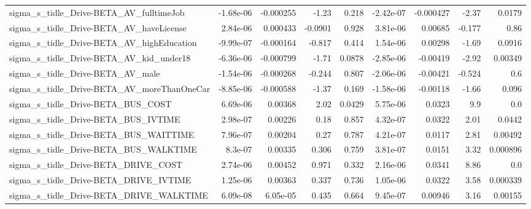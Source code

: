\begin{tabular}{lrrrrrrrr}
sigma\_s\_tidle\_Drive-BETA\_AV\_fulltimeJob            &   -1.68e-06 &    -0.000255 &    -1.23 &    0.218 &  -2.42e-07 &   -0.000427 &        -2.37 &        0.0179 \\
sigma\_s\_tidle\_Drive-BETA\_AV\_haveLicense            &    2.84e-06 &     0.000433 &  -0.0901 &    0.928 &   3.81e-06 &     0.00685 &       -0.177 &          0.86 \\
sigma\_s\_tidle\_Drive-BETA\_AV\_highEducation          &   -9.99e-07 &    -0.000164 &   -0.817 &    0.414 &   1.54e-06 &     0.00298 &        -1.69 &        0.0916 \\
sigma\_s\_tidle\_Drive-BETA\_AV\_kid\_under18            &   -6.36e-06 &    -0.000799 &    -1.71 &   0.0878 &  -2.85e-06 &    -0.00419 &        -2.92 &       0.00349 \\
sigma\_s\_tidle\_Drive-BETA\_AV\_male                   &   -1.54e-06 &    -0.000268 &   -0.244 &    0.807 &  -2.06e-06 &    -0.00421 &       -0.524 &           0.6 \\
sigma\_s\_tidle\_Drive-BETA\_AV\_moreThanOneCar         &   -8.85e-06 &    -0.000588 &    -1.37 &    0.169 &  -1.58e-06 &    -0.00118 &        -1.66 &         0.096 \\
sigma\_s\_tidle\_Drive-BETA\_BUS\_COST                  &    6.69e-06 &      0.00368 &     2.02 &   0.0429 &   5.75e-06 &      0.0323 &          9.9 &           0.0 \\
sigma\_s\_tidle\_Drive-BETA\_BUS\_IVTIME                &    2.98e-07 &      0.00226 &     0.18 &    0.857 &   4.32e-07 &      0.0322 &         2.01 &        0.0442 \\
sigma\_s\_tidle\_Drive-BETA\_BUS\_WAITTIME              &    7.96e-07 &      0.00204 &     0.27 &    0.787 &   4.21e-07 &      0.0117 &         2.81 &       0.00492 \\
sigma\_s\_tidle\_Drive-BETA\_BUS\_WALKTIME              &     8.3e-07 &      0.00335 &    0.306 &    0.759 &   3.81e-07 &      0.0151 &         3.32 &      0.000896 \\
sigma\_s\_tidle\_Drive-BETA\_DRIVE\_COST                &    2.74e-06 &      0.00452 &    0.971 &    0.332 &   2.16e-06 &      0.0341 &         8.86 &           0.0 \\
sigma\_s\_tidle\_Drive-BETA\_DRIVE\_IVTIME              &    1.25e-06 &      0.00363 &    0.337 &    0.736 &   1.05e-06 &      0.0322 &         3.58 &      0.000339 \\
sigma\_s\_tidle\_Drive-BETA\_DRIVE\_WALKTIME            &    6.09e-08 &     6.05e-05 &    0.435 &    0.664 &   9.45e-07 &     0.00946 &         3.16 &       0.00155 \\

\end{tabular}
